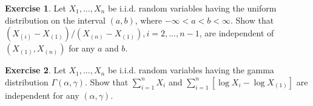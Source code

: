 \documentclass{article}
\theoremstyle{definition}
\newtheorem*{exercise*}{Exercise}
\begin{document}
	\begin{exercise*}
		Let $X_1, \ldots, X_n$ be i.i.d. random variables having the uniform distribution on the interval $(a, b)$, where $-\infty<a<b<\infty$. Show that $\left(X_{(i)}-X_{(1)}\right) /\left(X_{(n)}-X_{(1)}\right), i=2, \ldots, n-1$, are independent of $\left(X_{(1)}, X_{(n)}\right)$ for any $a$ and $b$.
	\end{exercise*}
	
	\begin{exercise*}
		Let $X_1, \ldots, X_n$ be i.i.d. random variables having the gamma distribution $\Gamma(\alpha, \gamma)$. Show that $\sum_{i=1}^n X_i$ and $\sum_{i=1}^n\left[\log X_i-\log X_{(1)}\right]$ are independent for any $(\alpha, \gamma)$.
	\end{exercise*}
	
	
	

\end{document}
